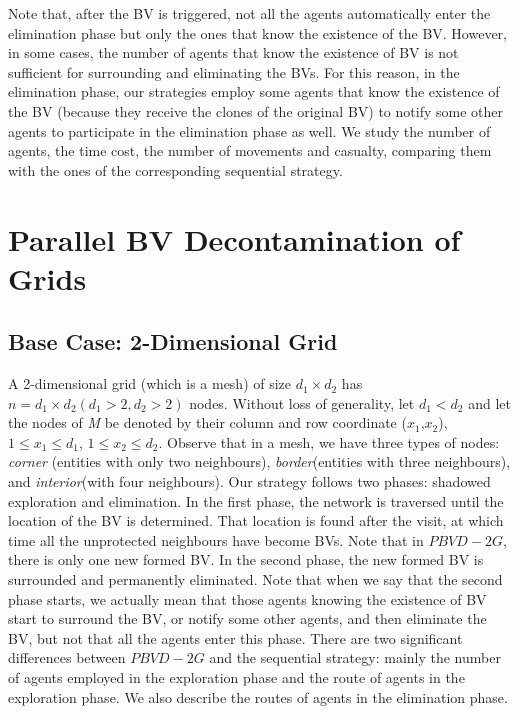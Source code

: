 Note that, after the BV is triggered, not all the agents automatically enter the elimination phase but only the ones that   know the existence of the  BV. However,  in some cases, the number of agents that know the existence of BV is not sufficient for surrounding and eliminating the BVs. For this reason,  in the elimination phase, our strategies employ some agents that know  the existence of the BV (because they receive the clones of the original BV) to notify some other agents to participate in the elimination phase as well. 
We study the number of agents, the time cost, the number of movements and  casualty, comparing them with  the ones of the corresponding sequential strategy.

\section{Parallel BV Decontamination of Grids}
\subsection{Base Case: 2-Dimensional Grid}
A 2-dimensional grid (which is a mesh) of size $d_1\times d_2$ has $n=d_1\times d_2 (d_1>2,d_2>2)$ nodes. Without loss of generality, let $d_1<d_2$ and let the nodes of {\em M} be denoted by their column and row coordinate ($x_1$,$x_2$), $1\leq x_1 \leq d_1$, $1\leq x_2 \leq d_2$. Observe that in a mesh, we have three types of nodes: \textit{corner} (entities with only two neighbours), \textit{border}(entities with three neighbours), and \textit{interior}(with four neighbours).  Our strategy follows two phases: shadowed exploration and elimination. In the first phase, the network is traversed until the location of the BV is determined. That location is found after the visit, at which time    all the  unprotected neighbours have become BVs.  Note that in $PBVD-2G$, there is  only one new formed BV. In the second phase, the new formed BV is surrounded and permanently eliminated. Note that when we say that  the second phase starts, we actually mean that those agents knowing the existence of BV start to surround the BV, or notify some other agents, and then eliminate the BV, but not   that all the agents enter this phase. There are two significant differences between $PBVD-2G$ and the sequential strategy: mainly the number of agents employed in the exploration phase and  the route of agents in the exploration phase. We also describe the routes of agents in the elimination phase. \ \\


